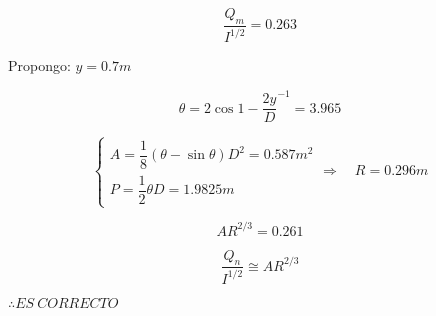 \begin{equation*}
  \dfrac{Q_{m}}{I^{1/2}} = 0.263
\end{equation*}

Propongo: $y = 0.7 m$

\begin{equation*}
  \theta = 2 \cos{1 - \dfrac{2 y}{D}}^{-1} = 3.965
\end{equation*}

\begin{equation*}
  \begin{cases}
    A = \dfrac{1}{8} (\theta - \sin{\theta}) D^{2} = 0.587 m^{2} \\
    P = \dfrac{1}{2} \theta D = 1.9825 m
  \end{cases}
  \Longrightarrow \quad
  R = 0.296 m
\end{equation*}

\begin{equation*}
  A R^{2/3} = 0.261
\end{equation*}

\begin{equation*}
  \dfrac{Q_{n}}{I^{1/2}} \cong A R^{2/3}
\end{equation*}

$\therefore ES\ CORRECTO$
